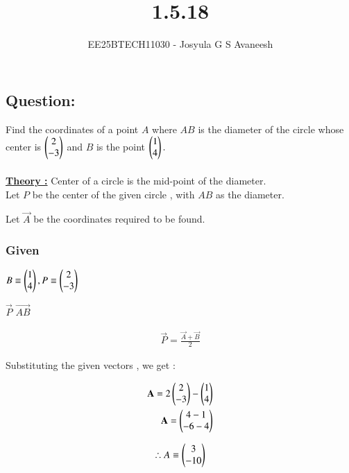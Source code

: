 \documentclass[journal]{IEEEtran}
\numberwithin{equation}{enumi}
\numberwithin{figure}{enumi}
\begin{document}

\vspace{3cm}

\title{1.5.18}
\author{EE25BTECH11030 - Josyula G S Avaneesh}
\maketitle

\subsection*{\textbf{Question:} } 
Find the coordinates of a point $A$ where $AB$ is the diameter of the circle whose center is  $\myvec{2\\-3 }$ and $B$ is the point $\myvec{1\\4}.$\\
\solution \\ 

\underline{\textbf{Theory :}} Center of a circle is the mid-point of the diameter. \\

Let $P$ be the center of the given circle , with $AB$ as the diameter.

Let $\vec{A}$ be the coordinates required to be found. 
\subsubsection*{Given }
 $B \equiv \myvec{1 \\ 4} , P \equiv \myvec{2\\-3}$ 
 
 $\vec{P}$  $\vec{AB}$ 

\begin{align}
    \vec{P} = \frac{\vec{A} + \vec{B}}{2}  
\end{align}

Substituting the given vectors , we get : 

\begin{align}
    \vec{A} = 2\myvec{2\\-3} - \myvec{1 \\ 4} \\ 
    \vec{A} = \myvec{ 4 - 1\\ -6 - 4  }      
\end{align}

\begin{align*}
        \therefore A \equiv \myvec{3\\-10}
\end{align*}
\end{document}
